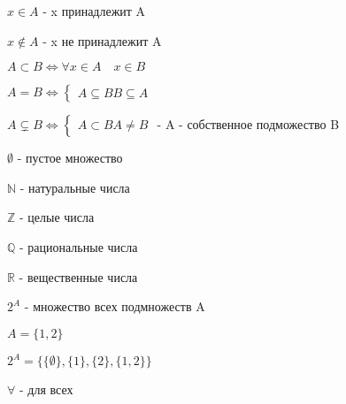         
        $x \in A$ - x принадлежит A
        
        $x \not\in A$ - x не принадлежит A
        
        $A \subset B \iff  \forall{x \in A}\quad x \in B$
        
        $A = B \iff \begin{cases} A \subseteq B B \subseteq A \end{cases}$
        
        $A \subsetneq B \iff  \begin{cases} A \subset B A \neq B  \end{cases}$ - A - собственное подможество B
        
        $\emptyset$ - пустое множество
        
        $\mathbb{N}$ - натуральные числа
        
        $\mathbb{Z}$ - целые числа
        
        $\mathbb{Q}$ - рациональные числа
        
        $\mathbb{R}$ - вещественные числа
        
        $2^A$ - множество всех подмножеств A
        
        $A = \{1, 2\}$
        
        $2^{A} = \{\{\emptyset\}, \{1\}, \{2\}, \{1, 2\}\}$
        
        $\forall$ - для всех
        
